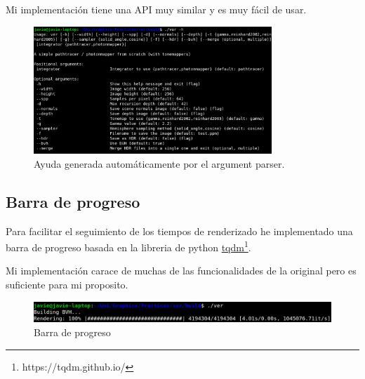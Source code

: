 \documentclass{article}
\begin{document}
Mi implementación tiene una API muy similar y es muy fácil de usar.

\begin{figure}[h]
  \centering \includegraphics[width=0.8\textwidth]{imgs/args.png}
  \caption{Ayuda generada automáticamente por el argument parser.}
\end{figure}

\subsection{Barra de progreso}
Para facilitar el seguimiento de los tiempos de renderizado he implementado una
barra de progreso basada en la libreria de python
\href{https://tqdm.github.io/}{tqdm}\footnote{https://tqdm.github.io/}.

Mi implementación carace de muchas de las funcionalidades de la original pero es
suficiente para mi proposito.

\begin{figure}[h]
  \centering \includegraphics[width=1\textwidth]{imgs/lwpb.png}
  \caption{Barra de progreso}
\end{figure}

\medskip

\printbibliography
\end{document}
